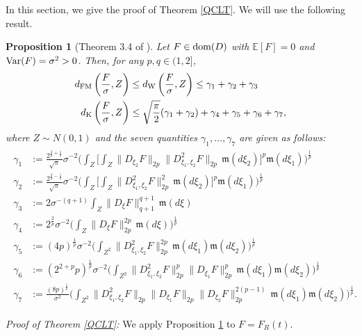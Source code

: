 \documentclass[12pt]{article}
\newtheorem{proposition}[theorem]{Proposition}
\def\bE{\mathbb{E}}
\newcommand{\fm}{\mathfrak{m}}
\begin{document}
In this section, we give the proof of Theorem \ref{QCLT}. We will use the following result.

\begin{proposition}[Theorem 3.4 of \cite{trauthwein25}]
\label{tara}
Let $F\in {\rm dom}(D)$ with $\bE[F]=0$ and  ${\rm Var}(F)=\sigma^2 > 0$. Then, 
for any $p,q\in (1,2]$,
\begin{align*}
d_{\rm FM}\left( \frac{F}{\sigma}, Z\right) & \leq d_{\rm W}\left(\frac{F}{\sigma}, Z\right)  \leq    \gamma_1 +  \gamma_2 +  \gamma_3\\
  d_{\rm K}\left(\frac{F}{\sigma}, Z\right) & \leq  \sqrt{ \frac{\pi}{2}} (  \gamma_1 +  \gamma_2)   +  \gamma_4 +  \gamma_5+  \gamma_6 +  \gamma_7,
\end{align*}
where  $Z\sim N(0,1)$ and the seven quantities $ \gamma_1, \ldots,  \gamma_7$ are given as follows:
\begin{align}
\begin{aligned}
 \gamma_1&:=  \frac{2^{\frac2p + \frac12} }{\sqrt{\pi}}
 \sigma^{-2} \bigg( \int_{Z}  \bigg[ \int_Z  \| D_{\xi_2}F \|_{2p}  \| D^2_{\xi_1,\xi_2}F\|_{2p} 
  \,  \fm(d\xi_2) \bigg]^p
  \fm(d\xi_1) \bigg)^{\frac1p}
\\
 \gamma_2&:=\frac{2^{\frac2p - \frac12} }{\sqrt{\pi}}
\sigma^{-2} \bigg( \int_{Z}  \bigg[ \int_Z   \| D^2_{\xi_1,\xi_2}F\|^2_{2p}  \,  \fm(d\xi_2) \bigg]^p
  \fm(d\xi_1) \bigg)^{\frac1p}
\\
 \gamma_3&:= 2 \sigma^{-(q+1)}\int_Z \| D_\xi F \|_{q+1}^{q+1}  \, \fm(d\xi)
\\
 \gamma_4&:= 2^{\frac{2}{p}} \sigma^{-2} \bigg( \int_Z \| D_\xi F \|_{2p}^{2p}  \, \fm(d\xi) \bigg)^{\frac1p}
\\
 \gamma_5&:= (4p)^{\frac1p} \sigma^{-2} \bigg( \int_{Z^2} \| D^2_{\xi_1,\xi_2}  F \|_{2p}^{2p}
\, \fm(d\xi_1)\fm(d\xi_2)  \bigg)^{\frac1p}
\\
 \gamma_6&:=(2^{2+p}p)^{\frac1p} \sigma^{-2} \bigg( \int_{Z^2} \| D^2_{\xi_1,\xi_2}  F \|_{2p}^{p}
 \| D_{\xi_1}F \|_{2p}^p
\, \fm(d\xi_1)\fm(d\xi_2)  \bigg)^{\frac1p}\\
 \gamma_7&:=  \frac{  (8p)^{\frac1p} }{\sigma^2}
 \bigg( \int_{Z^2} \| D^2_{\xi_1,\xi_2}  F \|_{2p}
 \| D_{\xi_1}F \|_{2p}  \| D_{\xi_2}F \|_{2p}^{2(p-1)}
\, \fm(d\xi_1) \fm(d\xi_2)  \bigg)^{\frac1p}.
\end{aligned}
\label{gamma17}
\end{align}
\end{proposition}


{\em Proof of Theorem \ref{QCLT}:} We apply Proposition \ref{tara} to $F=F_{R}(t)$. 
\end{document}
